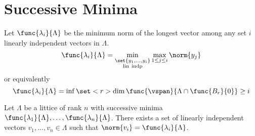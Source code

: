 \section{Successive Minima}
Let \(\func{\lambda_i}{\Lambda}\) be the minimum norm of the longest vector among any set \(i\) linearly independent vectors in \(\Lambda\). 
\begin{equation*}
    \func{\lambda_i}{\Lambda} = \min_{\substack{\set{y_1, \dots, y_i} \\ \mathrm{lin \ indp}}} \max_{1 \leq j \leq i} \norm{y_j}
\end{equation*}
or equivalently 
\begin{equation*}
    \func{\lambda_i}{\Lambda} = \inf \set<r>{\dim \func{\vspan}{ \Lambda \cap \func{B_r}{0} }\geq i}
\end{equation*}
\begin{theorem}
    Let \(\Lambda\) be a littice of rank \(n\) with successive minima \(\func{\lambda_1}{\Lambda}, \dots, \func{\lambda_n}{\Lambda}\). There exists a set of linearly independent vectors \(v_1, \dots, v_n \in \Lambda\) such that \(\norm{v_i} = \func{\lambda_i}{\Lambda}\). 
\end{theorem}
